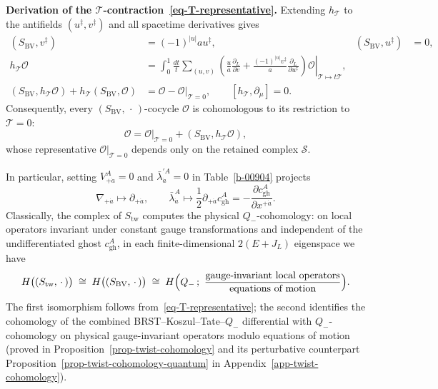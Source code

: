 \documentclass[11pt]{article}
\numberwithin{equation}{section}
\numberwithin{figure}{section}
\numberwithin{table}{section}
\begin{document}
\begin{proofbox}
\textbf{Derivation of the $\mathcal T$-contraction~\eqref{eq-T-representative}.} Extending $h_{\mathcal T}$ to the antifields $(u^\ddagger,v^\ddagger)$ and all spacetime derivatives gives
\begin{equation}\label{eq-B-6}
\begin{aligned}
(S_{\mathrm{BV}},v^\ddagger)&=(-1)^{|u|}a u^\ddagger,
&(S_{\mathrm{BV}},u^\ddagger)&=0,\\
h_{\mathcal T}\mathcal O
&=\int_0^1\frac{dt}{t}\left.
\sum_{(u,v)}\left(\frac ua\frac{\partial_L}{\partial v}
+\frac{(-1)^{|u|}v^\ddagger}{a}
\frac{\partial_L}{\partial u^\ddagger}\right)\mathcal O
\right|_{\mathcal T\mapsto t\mathcal T},\\
(S_{\mathrm{BV}},h_{\mathcal T}\mathcal O)
+h_{\mathcal T}(S_{\mathrm{BV}},\mathcal O)
&=\mathcal O-\mathcal O|_{\mathcal T=0},\qquad [h_{\mathcal T},\partial_\mu]=0.
\end{aligned}
\end{equation}
Consequently, every $(S_{\mathrm{BV}},\,\cdot\,)$-cocycle $\mathcal O$ is cohomologous to its restriction to $\mathcal T=0$:
\begin{equation}\label{eq-T-representative}
\mathcal O=\mathcal O|_{\mathcal T=0}
+(S_{\mathrm{BV}},h_{\mathcal T}\mathcal O),
\end{equation}
whose representative $\mathcal O|_{\mathcal T=0}$ depends only on the retained complex $\mathcal S$.~\hfill\qedsymbol
\end{proofbox}

In particular, setting $V_{+\dot a}^A=0$ and $\bar\lambda^{\prime A}_{\dot a}=0$ in Table~\ref{b-00904} projects
\begin{equation}\label{eq-T-projection}
\nabla_{+\dot a}\longmapsto\partial_{+\dot a},\qquad
\bar\lambda_{\dot a}^A\longmapsto
\frac12\partial_{+\dot a}c_{\mathrm{gh}}^A
=-\frac{\partial c_{\mathrm{gh}}^A}{\partial x^{+\dot a}}.
\end{equation}
Classically, the complex of $S_{\mathrm{tw}}$ computes the physical $Q_-$-cohomology: on local operators invariant under constant gauge transformations and independent of the undifferentiated ghost $c_{\mathrm{gh}}^A$, in each finite-dimensional $2(E+J_L)$ eigenspace we have
\begin{equation}\label{eq-twist-cohomology}
H\bigl((S_{\mathrm{tw}},\,\cdot\,)\bigr)
\;\cong\;H\bigl((S_{\mathrm{BV}},\,\cdot\,)\bigr)
\;\cong\;H\Bigl(Q_-\,;\ \frac{\text{gauge-invariant local operators}}{\text{equations of motion}}\Bigr).
\end{equation}
The first isomorphism follows from~\eqref{eq-T-representative}; the second identifies the cohomology of the combined BRST--Koszul--Tate--$Q_-$ differential with $Q_-$-cohomology on physical gauge-invariant operators modulo equations of motion~\cite{CostelloTwist,SaberiWilliams,ESW,semichiral,BK} (proved in Proposition~\ref{prop-twist-cohomology} and its perturbative counterpart Proposition~\ref{prop-twist-cohomology-quantum} in Appendix~\ref{app-twist-cohomology}).
\end{document}
